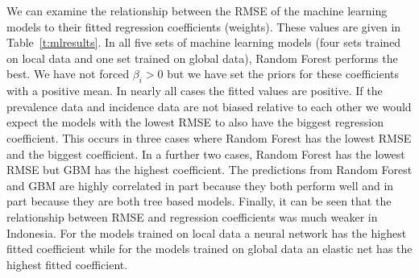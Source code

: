 \documentclass[review]{elsarticle}
\begin{document}
We can examine the relationship between the RMSE of the machine learning models to their fitted regression coefficients (weights).
These values are given in Table~\ref{t:mlresults}.
In all five sets of machine learning models (four sets trained on local data and one set trained on global data), Random Forest performs the best.
We have not forced $\beta_i > 0$ but we have set the priors for these coefficients with a positive mean.
In nearly all cases the fitted values are positive.
If the prevalence data and incidence data are not biased relative to each other we would expect the models with the lowest RMSE to also have the biggest regression coefficient.
This occurs in three cases where Random Forest has the lowest RMSE and the biggest coefficient.
In a further two cases, Random Forest has the lowest RMSE but GBM has the highest coefficient.
The predictions from Random Forest and GBM are highly correlated in part because they both perform well and in part because they are both tree based models.
Finally, it can be seen that the relationship between RMSE and regression coefficients was much weaker in Indonesia.
For the models trained on local data a neural network has the highest fitted coefficient while for the models trained on global data an elastic net has the highest fitted coefficient.





\end{document}
